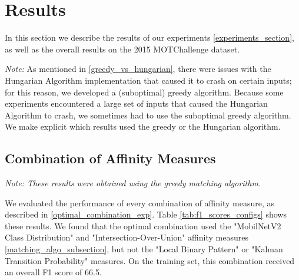 \documentclass[10pt,twocolumn,letterpaper]{article}
\begin{document}
\label{results_section}
\section{Results}
In this section we describe the results of our experiments \ref{experiments_section}, as well as the overall results on the 2015 MOTChallenge \cite{motchallenge2015} dataset.

\textit{Note:} As mentioned in \ref{greedy_vs_hungarian}, there were issues with the Hungarian Algorithm implementation that caused it to crash on certain inputs; for this reason, we developed a (suboptimal) greedy algorithm.
Because some experiments encountered a large set of inputs that caused the Hungarian Algorithm to crash, we sometimes had to use the suboptimal greedy algorithm.
We make explicit which results used the greedy or the Hungarian algorithm.
 
\subsection{Combination of Affinity Measures}
\textit{Note: These results were obtained using the greedy matching algorithm.}

We evaluated the performance of every combination of affinity measure, as described in \ref{optimal_combination_exp}.
Table \ref{tab:f1_scores_configs} shows these results.
We found that the optimal combination used the "MobilNetV2 Class Distribution" and "Intersection-Over-Union" affinity measures \ref{matching_algo_subsection}, but not the "Local Binary Pattern" or "Kalman Transition Probability" measures.
On the training set, this combination received an overall F1 score of 66.5.
\end{document}
